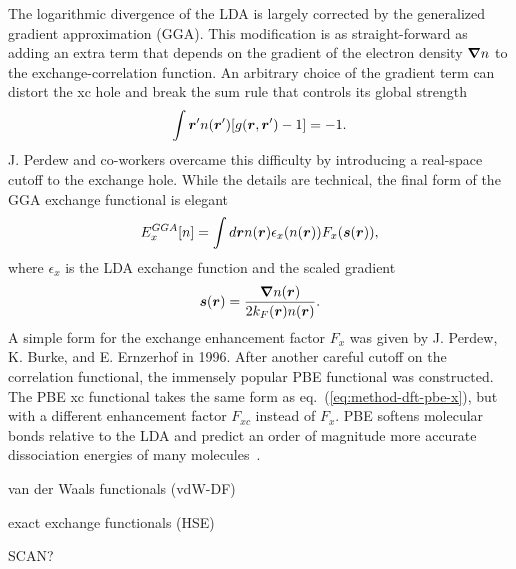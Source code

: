 The logarithmic divergence of the LDA is largely corrected by the generalized gradient approximation (GGA). This modification is as straight-forward as adding an extra term that depends on the gradient of the electron density $\boldsymbol{\nabla}n$ to the exchange-correlation function. An arbitrary choice of the gradient term can distort the xc hole and break the sum rule that controls its global strength
\begin{align}
\int\boldsymbol{r}' n(\boldsymbol{r}')[g(\boldsymbol{r},\boldsymbol{r}')-1] = -1.
\end{align}
J. Perdew and co-workers overcame this difficulty by introducing a real-space cutoff to the exchange hole. While the details are technical, the final form of the GGA exchange functional is elegant
\begin{align} \label{eq:method-dft-pbe-x}
E_x^{GGA}[n] = \int d\boldsymbol{r} n(\boldsymbol{r})\epsilon_x(n(\boldsymbol{r}))F_x(\boldsymbol{s}(\boldsymbol{r})),
\end{align}
where $\epsilon_x$ is the LDA exchange function and the scaled gradient
\begin{align}
\boldsymbol{s}(\boldsymbol{r}) = \dfrac{\boldsymbol{\nabla}n(\boldsymbol{r})}{2k_F(\boldsymbol{r})n(\boldsymbol{r})}.
\end{align}
A simple form for the exchange enhancement factor $F_x$ was given by J. Perdew, K. Burke, and E. Ernzerhof in 1996. After another careful cutoff on the correlation functional, the immensely popular PBE functional was constructed. The PBE xc functional takes the same form as eq.~(\ref{eq:method-dft-pbe-x}), but with a different enhancement factor $F_{xc}$ instead of $F_x$.
PBE softens molecular bonds relative to the LDA and predict an order of magnitude more accurate dissociation energies of many molecules~\cite{Perdew1996}.

van der Waals functionals (vdW-DF)

exact exchange functionals (HSE)

SCAN?